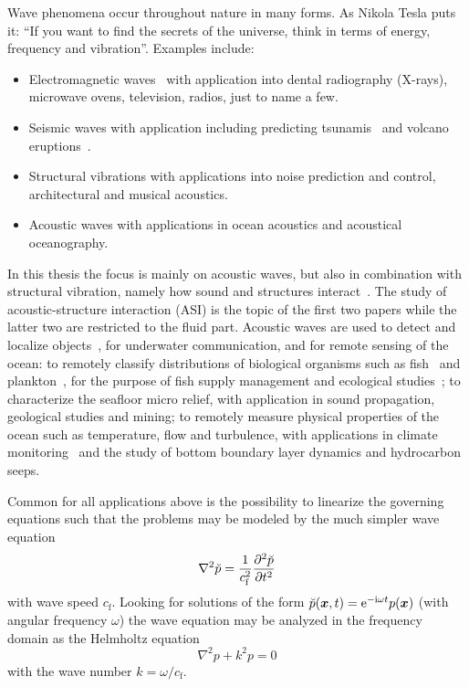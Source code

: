 Wave phenomena occur throughout nature in many forms. As Nikola Tesla puts it: ``If you want to find the secrets of the universe, think in terms of energy, frequency and vibration''. Examples include:
\begin{itemize}
	\item Electromagnetic waves~\cite{Dobbs1985ew} with application into dental radiography (X-rays), microwave ovens, television, radios, just to name a few.
	\item Seismic waves with application including predicting tsunamis~\cite{Bernard2009t} and volcano eruptions~\cite{Brenguier2008tfv}.
	\item Structural vibrations with applications into noise prediction and control, architectural and musical acoustics.
	\item Acoustic waves with applications in ocean acoustics and acoustical oceanography\cite{Munk2009oat,Iorio2017tyo}. 
\end{itemize}
In this thesis the focus is mainly on acoustic waves, but also in combination with structural vibration, namely how sound and structures interact~\cite{Junger1986ssa}. The study of acoustic-structure interaction (ASI) is the topic of the first two papers while the latter two are restricted to the fluid part. Acoustic waves are used to detect and localize objects~\cite{Lurton2002ait}, for underwater communication, and for remote sensing of the ocean: to remotely classify distributions of biological organisms such as fish~\cite{MacLennan1989amo} and plankton~\cite{Stanton2000rar}, for the purpose of fish supply management and ecological studies~\cite{Pena2008mtt}; to characterize the seafloor micro relief, with application in sound propagation, geological studies and mining; to remotely measure physical properties of the ocean such as temperature, flow and turbulence, with applications in climate monitoring~\cite{Consortium1998occ} and the study of bottom boundary layer dynamics and hydrocarbon seeps. 

Common for all applications above is the possibility to linearize the governing equations such that the problems may be modeled by the much simpler wave equation
\begin{equation}\label{Eq:waveEquation}
	\nabla^2 \breve{p} = \frac{1}{c_{\mathrm{f}}^2}\pderiv[2]{\breve{p}}{t}
\end{equation}
with wave speed $c_{\mathrm{f}}$. Looking for solutions of the form $\breve{p}(\vec{x},t)=\euler^{-\imag\omega t}p(\vec{x})$ (with angular frequency $\omega$) the wave equation may be analyzed in the frequency domain as the Helmholtz equation
\begin{equation}
	\nabla^2 p + k^2 p = 0
\end{equation}
with the wave number $k=\omega/c_{\mathrm{f}}$. 

